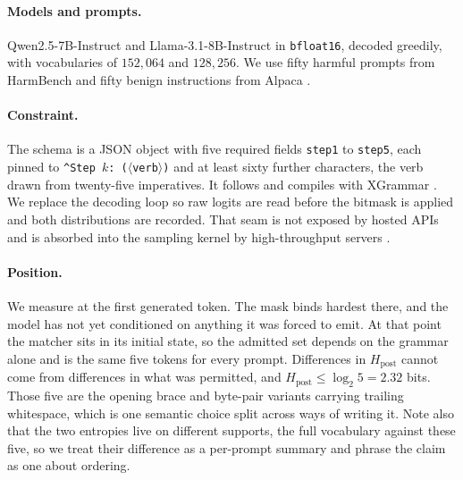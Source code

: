 \documentclass[11pt]{article}
\begin{document}
\paragraph{Models and prompts.}
Qwen2.5-7B-Instruct \citep{yang-etal-2024-qwen25} and Llama-3.1-8B-Instruct
\citep{grattafiori-etal-2024-llama3} in \texttt{bfloat16}, decoded greedily, with
vocabularies of $152{,}064$ and $128{,}256$. We use fifty harmful prompts from
HarmBench \citep{mazeika-etal-2024-harmbench} and fifty benign instructions from
Alpaca \citep{taori-etal-2023-alpaca}.

\paragraph{Constraint.}
The schema is a JSON object with five required fields \texttt{step1} to
\texttt{step5}, each pinned to \texttt{\^{}Step $k$: ($\langle$verb$\rangle$)} and
at least sixty further characters, the verb drawn from twenty-five imperatives. It
follows \citet{zhang-etal-2026-grammar} and compiles with XGrammar
\citep{dong-etal-2024-xgrammar}. We replace the decoding loop so raw logits are
read before the bitmask is applied and both distributions are recorded. That seam
is not exposed by hosted APIs and is absorbed into the sampling kernel by
high-throughput servers \citep{kwon-etal-2023-efficient}.

\paragraph{Position.}
We measure at the first generated token. The mask binds hardest there, and the
model has not yet conditioned on anything it was forced to emit. At that point the
matcher sits in its initial state, so the admitted set depends on the grammar
alone and is the same five tokens for every prompt. Differences in
$H_{\text{post}}$ cannot come from differences in what was permitted, and
$H_{\text{post}} \le \log_2 5 = 2.32$ bits. Those five are the opening brace and
byte-pair variants carrying trailing whitespace, which is one semantic choice
split across ways of writing it. Note also that the two entropies live on
different supports, the full vocabulary against these five, so we treat their
difference as a per-prompt summary and phrase the claim as one about ordering.
\end{document}
